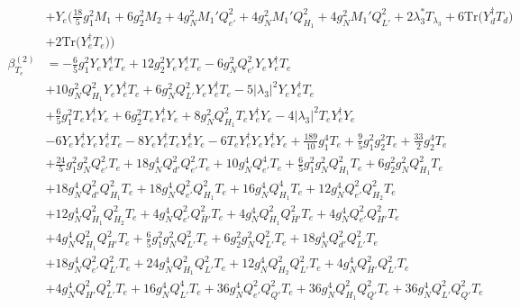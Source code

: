{\begin{align}
 &+Y_e \Big(\frac{18}{5} g_{1}^{2} M_1 +6 g_{2}^{2} M_2 +4 g_{N}^{2} M_1' Q_{e'}^{2} +4 g_{N}^{2} M_1' Q_{H_1}^{2} +4 g_{N}^{2} M_1' Q_{L'}^{2} +2 \lambda_3^* T_{\lambda_3} +6 \mbox{Tr}\Big({Y_{d}^{\dagger}  T_d}\Big) \nonumber \\ 
 &+2 \mbox{Tr}\Big({Y_{e}^{\dagger}  T_e}\Big) \Big)\\ 
\beta_{T_e}^{(2)} & =  
-\frac{6}{5} g_{1}^{2} {Y_e  Y_{e}^{\dagger}  T_e} +12 g_{2}^{2} {Y_e  Y_{e}^{\dagger}  T_e} -6 g_{N}^{2} Q_{e'}^{2} {Y_e  Y_{e}^{\dagger}  T_e} \nonumber \\ 
 &+10 g_{N}^{2} Q_{H_1}^{2} {Y_e  Y_{e}^{\dagger}  T_e} +6 g_{N}^{2} Q_{L'}^{2} {Y_e  Y_{e}^{\dagger}  T_e} -5 |\lambda_3|^2 {Y_e  Y_{e}^{\dagger}  T_e} \nonumber \\ 
 &+\frac{6}{5} g_{1}^{2} {T_e  Y_{e}^{\dagger}  Y_e} +6 g_{2}^{2} {T_e  Y_{e}^{\dagger}  Y_e} +8 g_{N}^{2} Q_{H_1}^{2} {T_e  Y_{e}^{\dagger}  Y_e} -4 |\lambda_3|^2 {T_e  Y_{e}^{\dagger}  Y_e} \nonumber \\ 
 &-6 {Y_e  Y_{e}^{\dagger}  Y_e  Y_{e}^{\dagger}  T_e} -8 {Y_e  Y_{e}^{\dagger}  T_e  Y_{e}^{\dagger}  Y_e} -6 {T_e  Y_{e}^{\dagger}  Y_e  Y_{e}^{\dagger}  Y_e} +\frac{189}{10} g_{1}^{4} T_e +\frac{9}{5} g_{1}^{2} g_{2}^{2} T_e +\frac{33}{2} g_{2}^{4} T_e \nonumber \\ 
 &+\frac{24}{5} g_{1}^{2} g_{N}^{2} Q_{e'}^{2} T_e +18 g_{N}^{4} Q_{d'}^{2} Q_{e'}^{2} T_e +10 g_{N}^{4} Q_{e'}^{4} T_e +\frac{6}{5} g_{1}^{2} g_{N}^{2} Q_{H_1}^{2} T_e +6 g_{2}^{2} g_{N}^{2} Q_{H_1}^{2} T_e \nonumber \\ 
 &+18 g_{N}^{4} Q_{d'}^{2} Q_{H_1}^{2} T_e +18 g_{N}^{4} Q_{e'}^{2} Q_{H_1}^{2} T_e +16 g_{N}^{4} Q_{H_1}^{4} T_e +12 g_{N}^{4} Q_{e'}^{2} Q_{H_2}^{2} T_e \nonumber \\ 
 &+12 g_{N}^{4} Q_{H_1}^{2} Q_{H_2}^{2} T_e +4 g_{N}^{4} Q_{e'}^{2} Q_{\bar{H}'}^{2} T_e +4 g_{N}^{4} Q_{H_1}^{2} Q_{\bar{H}'}^{2} T_e +4 g_{N}^{4} Q_{e'}^{2} Q_{H'}^{2} T_e \nonumber \\ 
 &+4 g_{N}^{4} Q_{H_1}^{2} Q_{H'}^{2} T_e +\frac{6}{5} g_{1}^{2} g_{N}^{2} Q_{L'}^{2} T_e +6 g_{2}^{2} g_{N}^{2} Q_{L'}^{2} T_e +18 g_{N}^{4} Q_{d'}^{2} Q_{L'}^{2} T_e \nonumber \\ 
 &+18 g_{N}^{4} Q_{e'}^{2} Q_{L'}^{2} T_e +24 g_{N}^{4} Q_{H_1}^{2} Q_{L'}^{2} T_e +12 g_{N}^{4} Q_{H_2}^{2} Q_{L'}^{2} T_e +4 g_{N}^{4} Q_{\bar{H}'}^{2} Q_{L'}^{2} T_e \nonumber \\ 
 &+4 g_{N}^{4} Q_{H'}^{2} Q_{L'}^{2} T_e +16 g_{N}^{4} Q_{L'}^{4} T_e +36 g_{N}^{4} Q_{e'}^{2} Q_{Q'}^{2} T_e +36 g_{N}^{4} Q_{H_1}^{2} Q_{Q'}^{2} T_e +36 g_{N}^{4} Q_{L'}^{2} Q_{Q'}^{2} T_e \nonumber \\ 

\end{align}}
